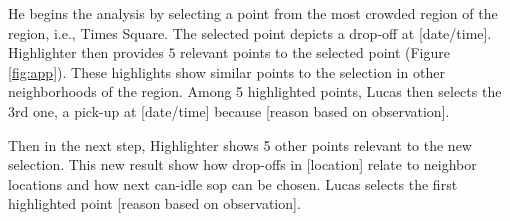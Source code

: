 He begins the analysis by selecting a point from the most crowded region of the region, i.e., Times Square. The selected point depicts a drop-off at [date/time]. {\sc Highlighter} then provides $5$ relevant points to the selected point (Figure \ref{fig:app}). These highlights show similar points to the selection in other neighborhoods of the region. Among 5 highlighted points, Lucas then selects the 3rd one, a pick-up at [date/time] because [reason based on observation].

Then in the next step, {\sc Highlighter} shows 5 other points relevant to the new selection. This new result show how drop-offs in [location] relate to neighbor locations and how next can-idle sop can be chosen. Lucas selects the first highlighted point [reason based on observation].